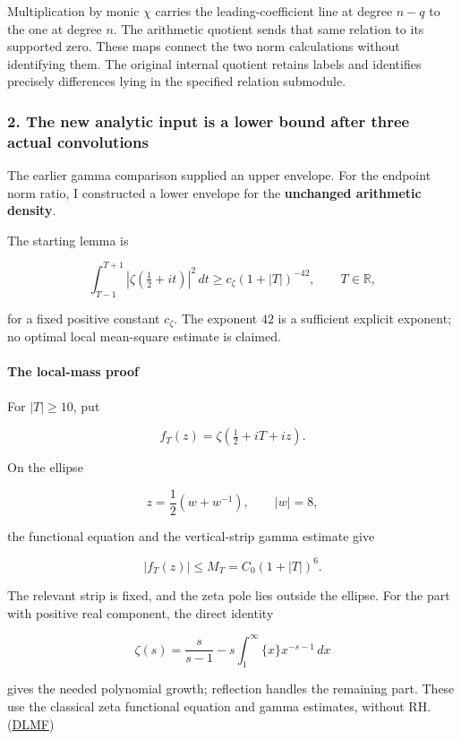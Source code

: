 Multiplication by monic \(\chi\) carries the leading-coefficient line at degree \(n-q\) to the one at degree \(n\). The arithmetic quotient sends that same relation to its supported zero. These maps connect the two norm calculations without identifying them. The original internal quotient retains labels and identifies precisely differences lying in the specified relation submodule.

\subsubsection{2. The new analytic input is a lower bound after three actual convolutions}\label{endpoint-user_norm_original--the-new-analytic-input-is-a-lower-bound-after-three-actual-convolutions}

The earlier gamma comparison supplied an upper envelope. For the endpoint norm ratio, I constructed a lower envelope for the \textbf{unchanged arithmetic density}.

The starting lemma is

\[
\boxed{
\int_{T-1}^{T+1}
|\zeta(\tfrac12+it)|^2\,dt
\ge c_\zeta(1+|T|)^{-42},
\qquad T\in\mathbb R,
}
\]

for a fixed positive constant \(c_\zeta\). The exponent \(42\) is a sufficient explicit exponent; no optimal local mean-square estimate is claimed.

\paragraph{The local-mass proof}\label{endpoint-user_norm_original--the-local-mass-proof}

For \(|T|\ge10\), put

\[
f_T(z)=\zeta(\tfrac12+iT+iz).
\]

On the ellipse

\[
z=\frac12(w+w^{-1}),
\qquad |w|=8,
\]

the functional equation and the vertical-strip gamma estimate give

\[
|f_T(z)|\le M_T=C_0(1+|T|)^6.
\]

The relevant strip is fixed, and the zeta pole lies outside the ellipse. For the part with positive real component, the direct identity

\[
\zeta(s)=\frac{s}{s-1}
-s\int_1^\infty\{x\}x^{-s-1}\,dx
\]

gives the needed polynomial growth; reflection handles the remaining part. These use the classical zeta functional equation and gamma estimates, without RH. (\href{https://dlmf.nist.gov/25.4}{DLMF})

